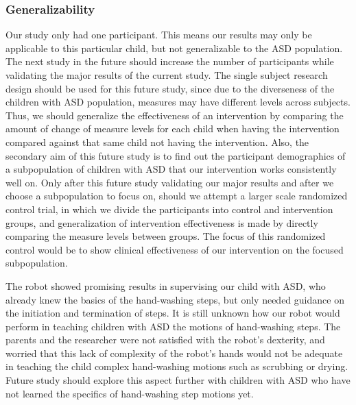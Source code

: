 \documentclass{ut-thesis}
\begin{document}
\subsubsection{Generalizability}
Our study only had one participant.  This means our results may only be applicable to this particular child, but not generalizable to the ASD population.  The next study in the future should increase the number of participants while validating the major results of the current study.  The single subject research design should be used for this future study, since due to the diverseness of the children with ASD population, measures may have different levels across subjects.  Thus, we should generalize the effectiveness of an intervention by comparing the amount of change of measure levels for each child when having the intervention compared against that same child not having the intervention.  Also, the secondary aim of this future study is to find out the participant demographics of a subpopulation of children with ASD that our intervention works consistently well on.  Only after this future study validating our major results and after we choose a subpopulation to focus on, should we attempt a larger scale randomized control trial, in which we divide the participants into control and intervention groups, and generalization of intervention effectiveness is made by directly comparing the measure levels between groups.  The focus of this randomized control would be to show clinical effectiveness of our intervention on the focused subpopulation.

The robot showed promising results in supervising our child with ASD, who already knew the basics of the hand-washing steps, but only needed guidance on the initiation and termination of steps.  It is still unknown how our robot would perform in teaching children with ASD the motions of hand-washing steps.  The parents and the researcher were not satisfied with the robot's dexterity, and worried that this lack of complexity of the robot's hands would not be adequate in teaching the child complex hand-washing motions such as scrubbing or drying.  Future study should explore this aspect further with children with ASD who have not learned the specifics of hand-washing step motions yet.
\end{document}

